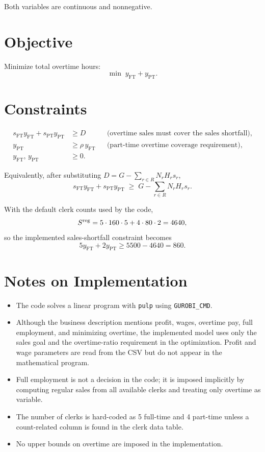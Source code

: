 Both variables are continuous and nonnegative.

\section*{Objective}

Minimize total overtime hours:
\[
\min \; y_{\mathrm{FT}} + y_{\mathrm{PT}}.
\]

\section*{Constraints}

\begin{align}
s_{\mathrm{FT}} y_{\mathrm{FT}} + s_{\mathrm{PT}} y_{\mathrm{PT}} &\ge D
&&\text{(overtime sales must cover the sales shortfall)},\\
y_{\mathrm{PT}} &\ge \rho\, y_{\mathrm{FT}}
&&\text{(part-time overtime coverage requirement)},\\
y_{\mathrm{FT}},\, y_{\mathrm{PT}} &\ge 0.
\end{align}

Equivalently, after substituting $D=G-\sum_{r\in R}N_rH_rs_r$,
\[
s_{\mathrm{FT}} y_{\mathrm{FT}} + s_{\mathrm{PT}} y_{\mathrm{PT}}
\;\ge\;
G-\sum_{r\in R}N_rH_rs_r.
\]

With the default clerk counts used by the code,
\[
S^{\textnormal{reg}}=5\cdot160\cdot5 + 4\cdot80\cdot2 = 4640,
\]
so the implemented sales-shortfall constraint becomes
\[
5y_{\mathrm{FT}} + 2y_{\mathrm{PT}} \ge 5500-4640=860.
\]

\section*{Notes on Implementation}

\begin{itemize}
    \item The code solves a linear program with \texttt{pulp} using \texttt{GUROBI\_CMD}.
    \item Although the business description mentions profit, wages, overtime pay, full employment, and minimizing overtime, the implemented model uses only the sales goal and the overtime-ratio requirement in the optimization. Profit and wage parameters are read from the CSV but do not appear in the mathematical program.
    \item Full employment is not a decision in the code; it is imposed implicitly by computing regular sales from all available clerks and treating only overtime as variable.
    \item The number of clerks is hard-coded as 5 full-time and 4 part-time unless a count-related column is found in the clerk data table.
    \item No upper bounds on overtime are imposed in the implementation.
\end{itemize}
